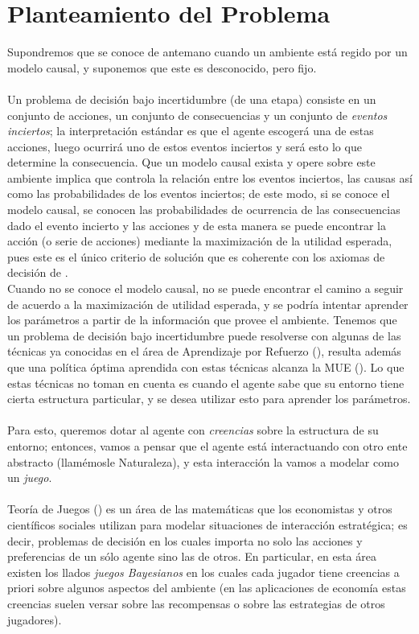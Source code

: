 \documentclass[11pt]{article}
\theoremstyle{plain}
\begin{document}
\section{Planteamiento del Problema}
Supondremos que se conoce de antemano cuando un ambiente está regido por un modelo causal, y suponemos que este es desconocido, pero fijo.\\
\\
Un problema de decisión bajo incertidumbre (de una etapa) consiste en un conjunto de acciones, un conjunto de consecuencias y un conjunto de \textit{eventos inciertos}; la interpretación estándar es que el agente escogerá una de estas acciones, luego ocurrirá uno de estos eventos inciertos y será esto lo que determine la consecuencia. Que un modelo causal exista y opere sobre este ambiente implica que controla la relación entre los eventos inciertos, las causas así como las probabilidades de los eventos inciertos; de este modo, si se conoce el modelo causal, se conocen las probabilidades de ocurrencia de las consecuencias dado el evento incierto y las acciones y de esta manera se puede encontrar la acción (o serie de acciones) mediante la maximización de la utilidad esperada, pues este es el único criterio de solución que es coherente con los axiomas de decisión de \cite{savage1954the}.
\\
Cuando no se conoce el modelo causal, no se puede encontrar el camino a seguir de acuerdo a la maximización de utilidad esperada, y se podría intentar aprender los parámetros a partir de la información que provee el ambiente. Tenemos que un problema de decisión bajo incertidumbre puede resolverse con algunas de las técnicas ya conocidas en el área de Aprendizaje por Refuerzo (\cite{sutton1998reinforcement}), resulta además que una política óptima aprendida con estas técnicas alcanza la MUE (\cite{webb2007game}). Lo que estas técnicas no toman en cuenta es cuando el agente sabe que su entorno tiene cierta estructura particular, y se desea utilizar esto para aprender los parámetros.\\
\\
Para esto, queremos dotar al agente con \textit{creencias} sobre la estructura de su entorno; entonces, vamos a pensar que el agente está interactuando con otro ente abstracto (llamémosle Naturaleza), y esta interacción la vamos a modelar como un \textit{juego}.\\
\\
Teoría de Juegos (\cite{osborne1994course}) es un área de las matemáticas que los economistas y otros científicos sociales utilizan para modelar situaciones de interacción estratégica; es decir, problemas de decisión en los cuales importa no solo las acciones y preferencias de un sólo agente sino las de otros. En particular, en esta área existen los llados \textit{juegos Bayesianos} en los cuales cada jugador tiene creencias a priori sobre algunos aspectos del ambiente (en las aplicaciones de economía estas creencias suelen versar sobre las recompensas o sobre las estrategias de otros jugadores).\\
\end{document}
